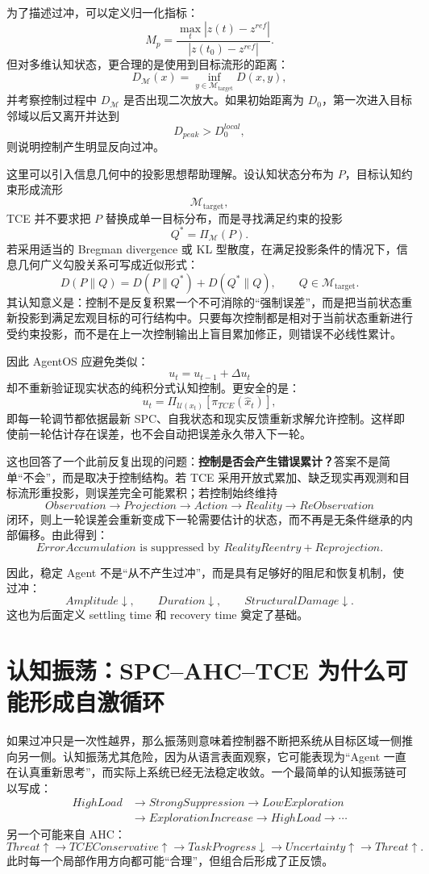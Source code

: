 为了描述过冲，可以定义归一化指标：
\[
M_p
=
\frac{
\max_t |z(t)-z^{ref}|
}{
|z(t_0)-z^{ref}|
}.
\]
但对多维认知状态，更合理的是使用到目标流形的距离：
\[
D_{\mathcal M}(x)
=
\inf_{y\in\mathcal M_{\mathrm{target}}}
D(x,y),
\]
并考察控制过程中 $D_{\mathcal M}$ 是否出现二次放大。如果初始距离为 $D_0$，第一次进入目标邻域以后又离开并达到
\[
D_{peak}>D_0^{local},
\]
则说明控制产生明显反向过冲。

这里可以引入信息几何中的投影思想帮助理解。设认知状态分布为 $P$，目标认知约束形成流形
\[
\mathcal M_{\mathrm{target}},
\]
TCE 并不要求把 $P$ 替换成单一目标分布，而是寻找满足约束的投影
\[
Q^{*}
=
\Pi_{\mathcal M}(P).
\]
若采用适当的 Bregman divergence 或 KL 型散度，在满足投影条件的情况下，信息几何广义勾股关系可写成近似形式：
\[
D(P\|Q)
=
D(P\|Q^{*})
+
D(Q^{*}\|Q),
\qquad
Q\in\mathcal M_{\mathrm{target}}.
\]
其认知意义是：控制不是反复积累一个不可消除的“强制误差”，而是把当前状态重新投影到满足宏观目标的可行结构中。只要每次控制都是相对于当前状态重新进行受约束投影，而不是在上一次控制输出上盲目累加修正，则错误不必线性累计。

因此 AgentOS 应避免类似：
\[
u_t=u_{t-1}+\Delta u_t
\]
却不重新验证现实状态的纯积分式认知控制。更安全的是：
\[
u_t
=
\Pi_{\mathcal U(x_t)}
\left[
\pi_{TCE}(\hat{x}_t)
\right],
\]
即每一轮调节都依据最新 SPC、自我状态和现实反馈重新求解允许控制。这样即使前一轮估计存在误差，也不会自动把误差永久带入下一轮。

这也回答了一个此前反复出现的问题：\textbf{控制是否会产生错误累计？}答案不是简单“不会”，而是取决于控制结构。若 TCE 采用开放式累加、缺乏现实再观测和目标流形重投影，则误差完全可能累积；若控制始终维持
\[
Observation
\rightarrow
Projection
\rightarrow
Action
\rightarrow
Reality
\rightarrow
ReObservation
\]
闭环，则上一轮误差会重新变成下一轮需要估计的状态，而不再是无条件继承的内部偏移。由此得到：
\[
\boxed{
ErrorAccumulation
\text{ is suppressed by }
RealityReentry
+
Reprojection.
}
\]

因此，稳定 Agent 不是“从不产生过冲”，而是具有足够好的阻尼和恢复机制，使过冲：
\[
Amplitude\downarrow,
\qquad
Duration\downarrow,
\qquad
StructuralDamage\downarrow.
\]
这也为后面定义 settling time 和 recovery time 奠定了基础。

\section{认知振荡：SPC--AHC--TCE 为什么可能形成自激循环}

如果过冲只是一次性越界，那么振荡则意味着控制器不断把系统从目标区域一侧推向另一侧。认知振荡尤其危险，因为从语言表面观察，它可能表现为“Agent 一直在认真重新思考”，而实际上系统已经无法稳定收敛。一个最简单的认知振荡链可以写成：
\[
\begin{aligned}
HighLoad&\rightarrow StrongSuppression\rightarrow LowExploration\\
&\rightarrow ExplorationIncrease\rightarrow HighLoad\rightarrow\cdots
\end{aligned}
\]
另一个可能来自 AHC：
\[
Threat\uparrow
\rightarrow
TCEConservative\uparrow
\rightarrow
TaskProgress\downarrow
\rightarrow
Uncertainty\uparrow
\rightarrow
Threat\uparrow.
\]
此时每一个局部作用方向都可能“合理”，但组合后形成了正反馈。

